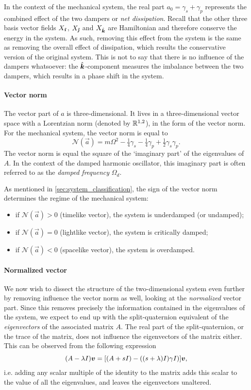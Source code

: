 In the context of the mechanical system, the real part $a_0 = \gamma_s + \gamma_p$ represents the combined effect of the two dampers or \emph{net dissipation}. Recall that the other three basis vector fields $X_\quati$, $X_\quatj$ and $X_\quatk$ are Hamiltonian and therefore conserve the energy in the system. As such, removing this effect from the system is the same as removing the overall effect of dissipation, which results the conservative version of the original system. This is not to say that there is no influence of the dampers whatsoever: the $\quatk$-component measures the imbalance between the two dampers, which results in a phase shift in the system.

\paragraph{Vector norm} The vector part of $a$ is three-dimensional. It lives in a three-dimensional vector space with a Lorentzian norm (denoted by $\real^{1, 2}$), in the form of the vector norm. For the mechanical system, the vector norm is equal to 
$$ \mathscr{N}(\vec{a}) = m\Omega^2 - \tfrac{1}{4}\gamma_s - \tfrac{1}{4}\gamma_p + \tfrac{1}{2}\gamma_s \gamma_p. $$
The vector norm is equal the square of the `imaginary part' of the eigenvalues of $A$. In the context of the damped harmonic oscillator, this imaginary part is often referred to as the \emph{damped frequency} $\Omega_d$. 

As mentioned in \cref{sec:system_classification}, the sign of the vector norm determines the regime of the mechanical system:
\begin{itemize}
    \item if $\mathscr{N}(\vec{a}) > 0$ (timelike vector), the system is underdamped (or undamped); 
    \item if $\mathscr{N}(\vec{a}) = 0$ (lightlike vector), the system is critically damped; 
    \item if $\mathscr{N}(\vec{a}) < 0$ (spacelike vector), the system is overdamped.
\end{itemize}

\paragraph{Normalized vector} We now wish to dissect the structure of the two-dimensional system even further by removing influence the vector norm as well, looking at the \emph{normalized} vector part. Since this removes precisely the information contained in the eigenvalues of the system, we expect to end up with the split-quaternion equivalent of the \emph{eigenvectors} of the associated matrix $A$. The real part of the split-quaternion, or the trace of the matrix, does not influence the eigenvectors of the matrix either. This can be observed from the following expression
$$ (A - \lambda I)\vec{v} = \qty[(A + s I) - ((s + \lambda) I) \gamma I)]\vec{v}, $$
i.e. adding any scalar multiple of the identity to the matrix adds this scalar to the value of all the eigenvalues, and leaves the eigenvectors unaltered.

